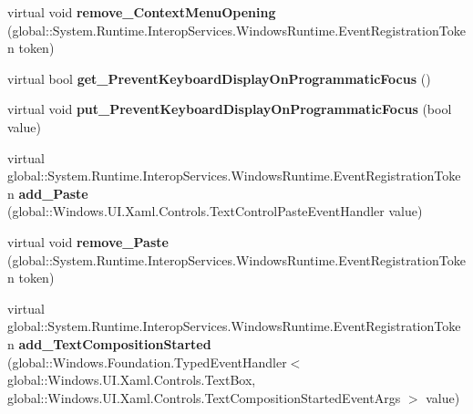\begin{DoxyCompactItemize}
virtual void {\bfseries remove\+\_\+\+Context\+Menu\+Opening} (global\+::\+System.\+Runtime.\+Interop\+Services.\+Windows\+Runtime.\+Event\+Registration\+Token token)
\item 
\mbox{\label{class_windows_1_1_u_i_1_1_xaml_1_1_controls_1_1_text_box_ab8c87aab30bc9eb47b16617cd979f283}} 
virtual bool {\bfseries get\+\_\+\+Prevent\+Keyboard\+Display\+On\+Programmatic\+Focus} ()
\item 
\mbox{\label{class_windows_1_1_u_i_1_1_xaml_1_1_controls_1_1_text_box_aeb5452275c88b059cb6fcab37f2c0547}} 
virtual void {\bfseries put\+\_\+\+Prevent\+Keyboard\+Display\+On\+Programmatic\+Focus} (bool value)
\item 
\mbox{\label{class_windows_1_1_u_i_1_1_xaml_1_1_controls_1_1_text_box_a228a83caf2e3f6ac77d710ba279dfb6e}} 
virtual global\+::\+System.\+Runtime.\+Interop\+Services.\+Windows\+Runtime.\+Event\+Registration\+Token {\bfseries add\+\_\+\+Paste} (global\+::\+Windows.\+U\+I.\+Xaml.\+Controls.\+Text\+Control\+Paste\+Event\+Handler value)
\item 
\mbox{\label{class_windows_1_1_u_i_1_1_xaml_1_1_controls_1_1_text_box_affd66f6fbd07759509d7f75dab0e7186}} 
virtual void {\bfseries remove\+\_\+\+Paste} (global\+::\+System.\+Runtime.\+Interop\+Services.\+Windows\+Runtime.\+Event\+Registration\+Token token)
\item 
\mbox{\label{class_windows_1_1_u_i_1_1_xaml_1_1_controls_1_1_text_box_a7ee5e64932c7b9974d38444e13822e2c}} 
virtual global\+::\+System.\+Runtime.\+Interop\+Services.\+Windows\+Runtime.\+Event\+Registration\+Token {\bfseries add\+\_\+\+Text\+Composition\+Started} (global\+::\+Windows.\+Foundation.\+Typed\+Event\+Handler$<$ global\+::\+Windows.\+U\+I.\+Xaml.\+Controls.\+Text\+Box, global\+::\+Windows.\+U\+I.\+Xaml.\+Controls.\+Text\+Composition\+Started\+Event\+Args $>$ value)
\item 
\mbox{\label{class_windows_1_1_u_i_1_1_xaml_1_1_controls_1_1_text_box_ad3e96b82e37de938e7295300b6dc9c44}} 

\end{DoxyCompactItemize}
